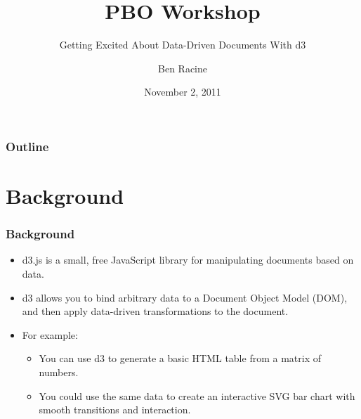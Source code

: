 \documentclass{beamer}
\title{PBO Workshop}
\subtitle{Getting Excited About Data-Driven Documents With d3}
\author{Ben Racine \inst{1} }
\institute{\inst{1} Cornerstone Systems NW }
\date{November 2, 2011}
\begin{document}
\begin{frame}
    \frametitle{}
    \titlepage
\end{frame}


 \begin{frame}
    \scriptsize{
        \frametitle{Outline}
        \tableofcontents[pausesections]
    }
 \end{frame}



\section{Background}



\begin{frame}
\frametitle{Background}
\begin{itemize}
\item d3.js is a small, free JavaScript library for manipulating documents based on data.
\item d3 allows you to bind arbitrary data to a Document Object Model (DOM), and then apply data-driven transformations to the document. 
\item For example:
    \begin{itemize}
    \item You can use d3 to generate a basic HTML table from a matrix of numbers.
    \item You could use the same data to create an interactive SVG bar chart with smooth transitions and interaction.
    \end{itemize}
\end{itemize}
\end{frame}
\end{document}
